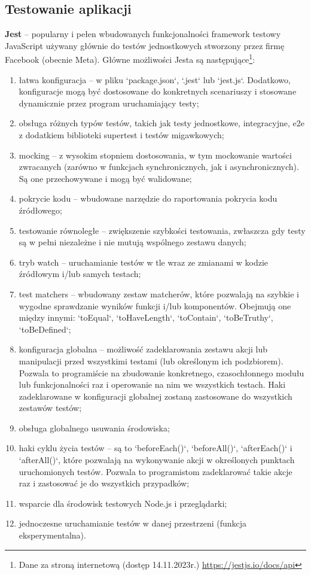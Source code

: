 \documentclass[12pt, a4paper, twoside, openany]{book}
\newcommand{\forceindent}{\leavevmode{\parindent=1.3em\indent}}
\begin{document}
\subsection{Testowanie aplikacji}
\forceindent \textbf{Jest} -- popularny i pełen wbudowanych funkcjonalności framework testowy JavaScript używany głównie do testów jednostkowych stworzony przez firmę Facebook (obecnie Meta). Główne możliwości Jesta są następujące\footnote{Dane za stroną internetową (dostęp 14.11.2023r.) \url{https://jestjs.io/docs/api}}:
\begin{enumerate}[label=--]
    \item łatwa konfiguracja -- w pliku `package.json`, `.jest` lub `jest.js`. Dodatkowo, konfiguracje mogą być dostosowane do konkretnych scenariuszy i stosowane dynamicznie przez program uruchamiający testy;
    \item obsługa różnych typów testów, takich jak testy jednostkowe, integracyjne, e2e z dodatkiem biblioteki supertest i testów migawkowych;
    \item mocking -- z wysokim stopniem dostosowania, w tym mockowanie wartości zwracanych (zarówno w funkcjach synchronicznych, jak i asynchronicznych). Są one przechowywane i mogą być walidowane;
    \item pokrycie kodu -- wbudowane narzędzie do raportowania pokrycia kodu źródłowego;
    \item testowanie równoległe -- zwiększenie szybkości testowania, zwłaszcza gdy testy są w pełni niezależne i nie mutują wspólnego zestawu danych;
    \item tryb watch -- uruchamianie testów w tle wraz ze zmianami w kodzie źródłowym i/lub samych testach;
    \item test matchers -- wbudowany zestaw matcherów, które pozwalają na szybkie i wygodne sprawdzanie wyników funkcji i/lub komponentów. Obejmują one między innymi: `toEqual`, `toHaveLength`, `toContain`, `toBeTruthy`, `toBeDefined`;
    \item konfiguracja globalna -- możliwość zadeklarowania zestawu akcji lub manipulacji przed wszystkimi testami (lub określonym ich podzbiorem). Pozwala to programiście na zbudowanie konkretnego, czasochłonnego modułu lub funkcjonalności raz i operowanie na nim we wszystkich testach. Haki zadeklarowane w konfiguracji globalnej zostaną zastosowane do wszystkich zestawów testów;
    \item obsługa globalnego usuwania środowiska;
    \item haki cyklu życia testów -- są to `beforeEach()`, `beforeAll()`, `afterEach()` i `afterAll()`, które pozwalają na wykonywanie akcji w określonych punktach uruchomionych testów. Pozwala to programistom zadeklarować takie akcje raz i zastosować je do wszystkich przypadków;
    \item wsparcie dla środowisk testowych Node.js i przeglądarki;
    \item jednoczesne uruchamianie testów w danej przestrzeni (funkcja eksperymentalna).
\end{enumerate}
\end{document}
